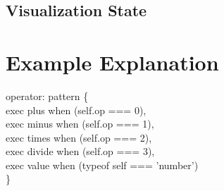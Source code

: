 \documentclass[11pt]{article}
\begin{document}
\subsection{Visualization State}


\section{Example Explanation}
operator: pattern \{
\\\indent exec plus when (self.op === 0),
\\\indent exec minus when (self.op === 1),
\\\indent exec times when (self.op === 2),
\\\indent exec divide when (self.op === 3),
\\\indent exec value when (typeof self === 'number')
\\ \}
\end{document}
